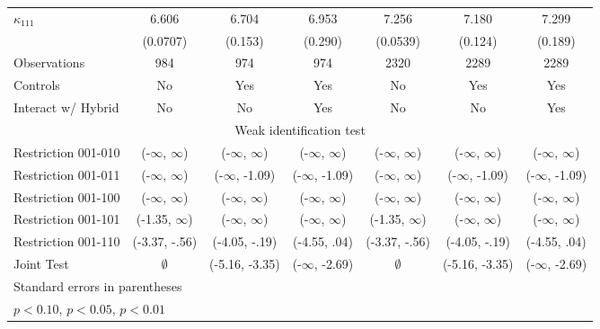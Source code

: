 \begin{table}[hbtp]
{\begin{tabular}{l*{6}{c}}
    $\kappa_{111}$&    6.606\sym{***}&    6.704\sym{***}&    6.953\sym{***}&    7.256\sym{***}&    7.180\sym{***}&    7.299\sym{***}\\
              & (0.0707)         &  (0.153)         &  (0.290)         & (0.0539)         &  (0.124)         &  (0.189)         \\
    \hline
    Observations&      984         &      974         &      974         &     2320         &     2289         &     2289         \\
    Controls  &       No         &      Yes         &      Yes         &       No         &      Yes         &      Yes         \\
    Interact w/ Hybrid&       No         &       No         &      Yes         &       No         &       No         &      Yes         \\
    \hline
    \multicolumn{7}{c}{Weak identification test}\\
    \midrule
    Restriction 001-010 & (-$\infty$, $\infty$)     &       (-$\infty$, $\infty$) &     (-$\infty$, $\infty$) &      (-$\infty$, $\infty$) &       (-$\infty$, $\infty$) &        (-$\infty$, $\infty$) \\
    Restriction 001-011 &  (-$\infty$, $\infty$)    &    (-$\infty$, -1.09) &           (-$\infty$, -1.09) &      (-$\infty$, $\infty$) &    (-$\infty$, -1.09) &     (-$\infty$, -1.09) \\
    Restriction 001-100 &  (-$\infty$, $\infty$)    &       (-$\infty$, $\infty$) &     (-$\infty$, $\infty$) &      (-$\infty$, $\infty$) &       (-$\infty$, $\infty$) &        (-$\infty$, $\infty$) \\
    Restriction 001-101 &  (-1.35, $\infty$)        &     (-$\infty$, $\infty$) &       (-$\infty$, $\infty$) &    (-1.35, $\infty$) &       (-$\infty$, $\infty$) &        (-$\infty$, $\infty$) \\
    Restriction 001-110 &  (-3.37, -.56) &   (-4.05, -.19) &                            (-4.55, .04) &  (-3.37, -.56) &   (-4.05, -.19) &     (-4.55, .04) \\
    \hline
    Joint Test  &  $\emptyset$ &  (-5.16, -3.35) &                              (-$\infty$, -2.69)  &         $\emptyset$ &  (-5.16, -3.35) &     (-$\infty$, -2.69) \\
    \hline
    \multicolumn{7}{l}{\footnotesize Standard errors in parentheses}\\
    \multicolumn{7}{l}{\footnotesize \sym{*} \(p<0.10\), \sym{**} \(p<0.05\), \sym{***} \(p<0.01\)}
    \end{tabular}
}
\end{table}

